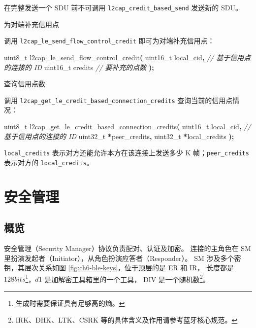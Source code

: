 \documentclass[
  12pt,
]{book}
\makeatletter
\newenvironment{Shaded}{\begin{snugshade}}{\end{snugshade}}
\newcommand{\CommentTok}[1]{\textcolor[rgb]{0.56,0.35,0.01}{\textit{#1}}}
\newcommand{\DataTypeTok}[1]{\textcolor[rgb]{0.13,0.29,0.53}{#1}}
\newcommand{\NormalTok}[1]{#1}
\newcommand{\OperatorTok}[1]{\textcolor[rgb]{0.81,0.36,0.00}{\textbf{#1}}}
\newenvironment{kframe}{%
\medskip{}
\setlength{\fboxsep}{.8em}
 \def\at@end@of@kframe{}%
 \ifinner\ifhmode%
  \def\at@end@of@kframe{\end{minipage}}%
  \begin{minipage}{\columnwidth}%
 \fi\fi%
 \def\FrameCommand##1{\hskip\@totalleftmargin \hskip-\fboxsep
 \colorbox{shadecolor}{##1}\hskip-\fboxsep
     \hskip-\linewidth \hskip-\@totalleftmargin \hskip\columnwidth}%
 \MakeFramed {\advance\hsize-\width
   \@totalleftmargin\z@ \linewidth\hsize
   \@setminipage}}%
 {\par\unskip\endMakeFramed%
 \at@end@of@kframe}
\newenvironment{rmdblock}[1]
  {
  \begin{itemize}
  \renewcommand{\labelitemi}{
    \raisebox{-.7\height}[0pt][0pt]{
      {\setkeys{Gin}{width=3em,keepaspectratio}\texttt{[image: images/\#1]}}
    }
  }
  \setlength{\fboxsep}{1em}
  \begin{kframe}
  \item
  }
  {
  \end{kframe}
  \end{itemize}
  }
\newenvironment{rmdcaution}
  {\begin{rmdblock}{caution}}
  {\end{rmdblock}}
\makeatother
\begin{document}
\begin{enumerate}
  \begin{rmdcaution}
   在完整发送一个 SDU 前不可调用 \texttt{l2cap\_credit\_based\_send}
   发送新的 SDU。
   \end{rmdcaution}
\item
  为对端补充信用点

  调用 \texttt{l2cap\_le\_send\_flow\_control\_credit} 即可为对端补充信用点：

\begin{Shaded}
\begin{Highlighting}[]
\DataTypeTok{uint8\_t}\NormalTok{ l2cap\_le\_send\_flow\_control\_credit}\OperatorTok{(}
  \DataTypeTok{uint16\_t}\NormalTok{ local\_cid}\OperatorTok{,}   \CommentTok{// 基于信用点的连接的 ID}
  \DataTypeTok{uint16\_t}\NormalTok{ credits      }\CommentTok{// 要补充的点数}
\OperatorTok{);}
\end{Highlighting}
\end{Shaded}
\item
  查询信用点数

  调用 \texttt{l2cap\_get\_le\_credit\_based\_connection\_credits} 查询当前的信用点情况：

\begin{Shaded}
\begin{Highlighting}[]
\DataTypeTok{uint8\_t}\NormalTok{ l2cap\_get\_le\_credit\_based\_connection\_credits}\OperatorTok{(}
  \DataTypeTok{uint16\_t}\NormalTok{ local\_cid}\OperatorTok{,}     \CommentTok{// 基于信用点的连接的 ID}
  \DataTypeTok{uint32\_t} \OperatorTok{*}\NormalTok{peer\_credits}\OperatorTok{,}
  \DataTypeTok{uint32\_t} \OperatorTok{*}\NormalTok{local\_credits}
\OperatorTok{);}
\end{Highlighting}
\end{Shaded}

  \texttt{local\_credits} 表示对方还能允许本方在该连接上发送多少 K 帧；\texttt{peer\_credits}
  表示对方的 \texttt{local\_credits}。
\end{enumerate}

\hypertarget{ch-sm}{%
\chapter{安全管理}\label{ch-sm}}

\hypertarget{ux6982ux89c8-6}{%
\section{概览}\label{ux6982ux89c8-6}}

安全管理（Security Manager）协议负责配对、认证及加密。
连接的主角色在 SM 里扮演发起者（Initiator），从角色扮演应答者（Responder）。
SM 涉及多个密钥，其层次关系如图 \ref{fig:ch6-ble-keys}，位于顶层的是 ER 和 IR，
长度都是 \(128 bits\)\footnote{生成时需要保证具有足够高的熵。}，\(d1\) 是加解密工具箱里的一个工具，
DIV 是一个随机数\footnote{IRK、DHK、LTK、CSRK 等的具体含义及作用请参考蓝牙核心规范。}。
\end{document}
